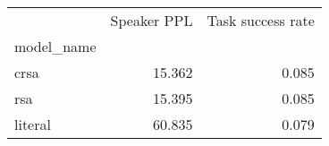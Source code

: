 \begin{tabular}{lrr}
\toprule
 & Speaker PPL & Task success rate \\
model_name &  &  \\
\midrule
crsa & 15.362 & 0.085 \\
rsa & 15.395 & 0.085 \\
literal & 60.835 & 0.079 \\
\bottomrule
\end{tabular}
